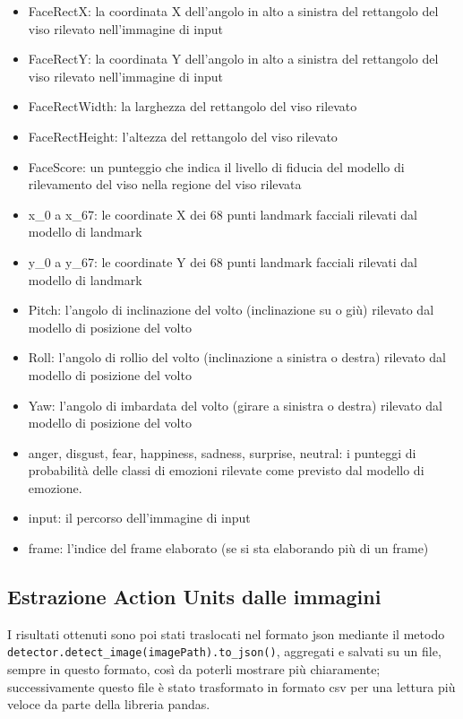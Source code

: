 \begin{itemize}
\item FaceRectX: la coordinata X dell'angolo in alto a sinistra del rettangolo del viso rilevato nell'immagine di input
\item FaceRectY: la coordinata Y dell'angolo in alto a sinistra del rettangolo del viso rilevato nell'immagine di input
\item FaceRectWidth: la larghezza del rettangolo del viso rilevato
\item FaceRectHeight: l'altezza del rettangolo del viso rilevato
\item FaceScore: un punteggio che indica il livello di fiducia del modello di rilevamento del viso nella regione del viso rilevata
\item x\_0 a x\_67: le coordinate X dei 68 punti landmark facciali rilevati dal modello di landmark
\item y\_0 a y\_67: le coordinate Y dei 68 punti landmark facciali rilevati dal modello di landmark
\item Pitch: l'angolo di inclinazione del volto (inclinazione su o giù) rilevato dal modello di posizione del volto
\item Roll: l'angolo di rollio del volto (inclinazione a sinistra o destra) rilevato dal modello di posizione del volto
\item Yaw: l'angolo di imbardata del volto (girare a sinistra o destra) rilevato dal modello di posizione del volto
\item anger, disgust, fear, happiness, sadness, surprise, neutral: i punteggi di probabilità delle classi di emozioni rilevate come previsto dal modello di emozione.
\item input: il percorso dell'immagine di input
\item frame: l'indice del frame elaborato (se si sta elaborando più di un frame)
\end{itemize}

\subsection{Estrazione Action Units dalle immagini}
I risultati ottenuti sono poi stati traslocati nel formato json mediante il metodo \texttt{detector.detect_image(imagePath).to_json()}, aggregati e salvati su un file, sempre in questo formato, così da poterli mostrare più chiaramente; successivamente questo file è stato trasformato in formato csv per una lettura più veloce da parte della libreria pandas.


